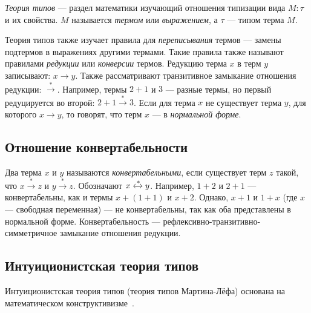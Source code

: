 \emph{Теория типов} — раздел математики изучающий отношения типизации вида
$ M \colon \tau $ и их свойства. $M$ называется \emph{термом} или \emph{выражением},
а $\tau$ — типом терма $M$.

Теория типов также изучает правила для \emph{переписывания} термов — замены
подтермов в выражениях другими термами.
Такие правила также называют правилами \emph{редукции} или \emph{конверсии} термов.
Редукцию терма $x$ в терм $y$ записывают: $x \to y$.
Также рассматривают транзитивное замыкание отношения редукции: $ \xrightarrow{*} $.
Например, термы $2 + 1$ и $3$ — разные термы, но первый редуцируется во второй:
$2 + 1 \xrightarrow{*} 3$.
Если для терма $x$ не существует терма $y$, для которого $x \to y$,
то говорят, что терм $x$ — в \emph{нормальной форме}.

\subsection{Отношение конвертабельности}

Два терма $x$ и $y$ называются \emph{конвертабельными},
если существует терм $z$ такой, что $x \xrightarrow{*} z$ и $y \xrightarrow{*} z$. Обозначают  $x \xleftrightarrow{*} y$.
Например, $1+2$ и $2+1$ — конвертабельны, как и термы
$x + (1 + 1)$ и $x + 2$. Однако, $x+1$ и $1+x$ (где $x$ — свободная переменная)
— не конвертабельны, так как оба представлены в нормальной форме.
Конвертабельность — рефлексивно-транзитивно-симметричное замыкание отношения
редукции.

\subsection{Интуиционистская теория типов}

Интуиционистская теория типов (теория типов Мартина-Лёфа)
основана на математическом конструктивизме~\cite{MLTT}.

